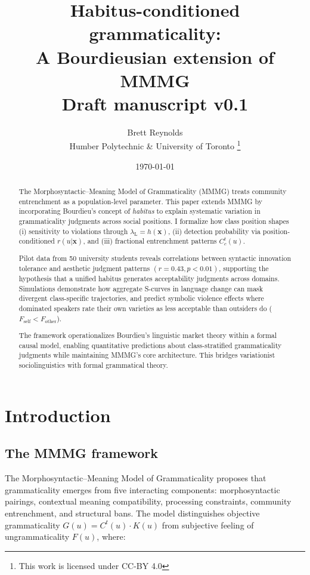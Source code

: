 \documentclass[12pt]{article}
\title{Habitus-conditioned grammaticality:\\A Bourdieusian extension of MMMG\\[4pt]
       \large Draft manuscript v0.1}
\author{Brett Reynolds \orcidlink{0000-0003-0073-7195}\\Humber Polytechnic \& University of Toronto
\thanks{This work is licensed under CC-BY 4.0}}
\date{\today}
\newcommand{\listener}{\mathrm{L}}
\begin{document}
\maketitle

\begin{abstract}
\small
The Morphosyntactic–Meaning Model of Grammaticality (MMMG) treats community entrenchment as a population-level parameter. This paper extends MMMG by incorporating Bourdieu's concept of \emph{habitus} to explain systematic variation in grammaticality judgments across social positions. I formalize how class position shapes (i) sensitivity to violations through $\lambda_{\listener} = h(\mathbf{x})$, (ii) detection probability via position-conditioned $r(u|\mathbf{x})$, and (iii) fractional entrenchment patterns $C^t_c(u)$. 

Pilot data from 50 university students reveals correlations between syntactic innovation tolerance and aesthetic judgment patterns $(r = 0.43, p < 0.01)$, supporting the hypothesis that a unified habitus generates acceptability judgments across domains. Simulations demonstrate how aggregate S-curves in language change can mask divergent class-specific trajectories, and predict symbolic violence effects where dominated speakers rate their own varieties as less acceptable than outsiders do ($F_{\text{self}} < F_{\text{other}}$).

The framework operationalizes Bourdieu's linguistic market theory within a formal causal model, enabling quantitative predictions about class-stratified grammaticality judgments while maintaining MMMG's core architecture. This bridges variationist sociolinguistics with formal grammatical theory.
\end{abstract}

\section{Introduction}

\subsection{The MMMG framework}

The Morphosyntactic–Meaning Model of Grammaticality \parencite{ReynoldsThisVolume} proposes that grammaticality emerges from five interacting components: morphosyntactic pairings, contextual meaning compatibility, processing constraints, community entrenchment, and structural bans. The model distinguishes objective grammaticality $G(u) = C^t(u) \cdot K(u)$ from subjective feeling of ungrammaticality $F(u)$, where:
\end{document}
